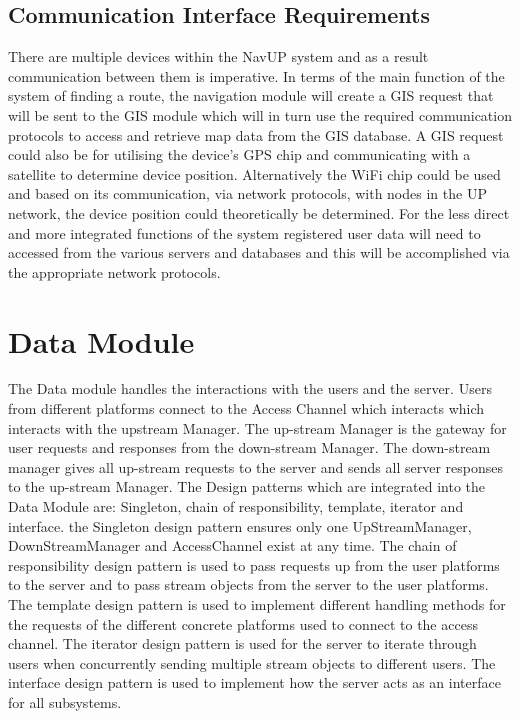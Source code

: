 \documentclass[a4paper, 12pt, one column]{article}
\begin{document}
\subsection{Communication Interface Requirements}
There are multiple devices within the NavUP system and as a result communication between them is imperative. In terms of the main function of the system of finding a route, the navigation module will create a GIS request that will be sent to the GIS module which will in turn use the required communication protocols to access and retrieve map data from the GIS database. A GIS request could also be for utilising the device’s GPS chip and communicating with a satellite to determine device position. Alternatively the WiFi chip could be used and based on its communication, via network protocols, with nodes in the UP network, the device position could theoretically be determined. For the less direct and more integrated functions of the system registered user data will need to accessed from the various servers and databases and this will be accomplished via the appropriate network protocols. 
    
\section{Data Module}
	The Data module handles the interactions with the users and the server. Users from different platforms connect to the Access Channel which interacts which interacts with the upstream Manager. The up-stream Manager is the gateway for user requests and responses from the down-stream Manager. The down-stream manager gives all up-stream requests to the server and sends all server responses to the up-stream Manager. The Design patterns which are integrated into the Data Module are: Singleton, chain of responsibility, template, iterator and interface. the Singleton design pattern ensures only one UpStreamManager, DownStreamManager and AccessChannel exist at any time. The chain of responsibility design pattern is used to pass requests up from the user platforms to the server and to pass stream objects from the server to the user platforms. The template design pattern is used to implement different handling methods for the requests of the different concrete platforms used to connect to the access channel. The iterator design pattern is used for the server to iterate through users when concurrently sending multiple stream objects to different users. The interface design pattern is used to implement how the server acts as an interface for all subsystems.
    
\end{document}
